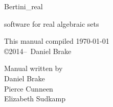 \documentclass[10pt]{article}
\begin{document}
\pagestyle{plain} 

	\setcounter{page}{1}


\begin{titlepage}

	\begin{center}
	\vspace{2cm}
	{\Large Bertini\_real}

\vspace{\baselineskip}
	{\large software for real algebraic sets}
	
	\vspace{3cm}
	\end{center}

	\vfill

	\begin{minipage}{\linewidth}

	\begin{minipage}{0.4\linewidth}
	\centering
	This manual compiled \today \\
	\copyright 2014--\the\year\ Daniel Brake
	\end{minipage}
	\hfill
	\begin{minipage}{0.4\linewidth}
	\centering Manual written by \vspace{\baselineskip}
	\\  Daniel Brake \\ Pierce Cunneen \\ Elizabeth Sudkamp 
	\end{minipage}

	\end{minipage}

	

\end{titlepage}




	\tableofcontents
	\eject
	\setcounter{page}{1}
	\eject


























\end{document}
